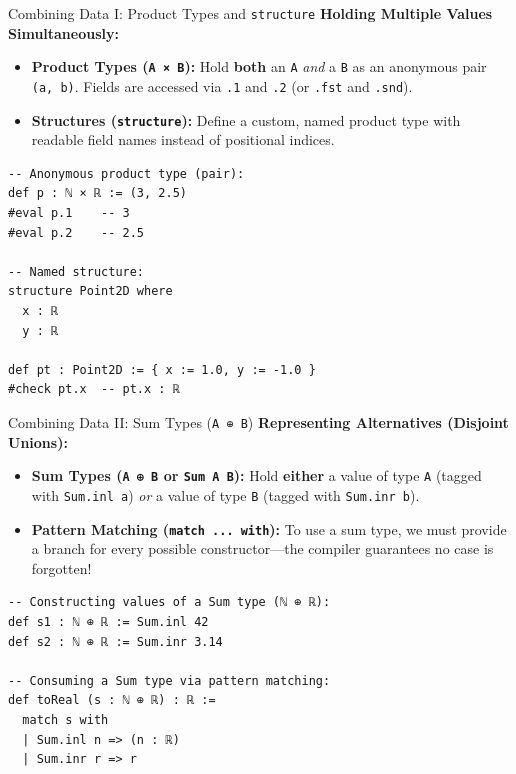 \documentclass[aspectratio=169, 10pt]{beamer}
\begin{document}
\begin{frame}[fragile]{Combining Data I: Product Types and \texttt{structure}}
  \textbf{Holding Multiple Values Simultaneously:}
  \begin{itemize}
    \item \textbf{Product Types (\texttt{A × B}):} Hold \textbf{both} an \texttt{A} \emph{and} a \texttt{B} as an anonymous pair \texttt{(a, b)}. Fields are accessed via \texttt{.1} and \texttt{.2} (or \texttt{.fst} and \texttt{.snd}).
    \item \textbf{Structures (\texttt{structure}):} Define a custom, named product type with readable field names instead of positional indices.
  \end{itemize}

  \vspace{0.15cm}
\begin{lstlisting}[language=Lean4]
-- Anonymous product type (pair):
def p : ℕ × ℝ := (3, 2.5)
#eval p.1    -- 3
#eval p.2    -- 2.5

-- Named structure:
structure Point2D where
  x : ℝ
  y : ℝ

def pt : Point2D := { x := 1.0, y := -1.0 }
#check pt.x  -- pt.x : ℝ
\end{lstlisting}
\end{frame}

\begin{frame}[fragile]{Combining Data II: Sum Types (\texttt{A ⊕ B})}
  \textbf{Representing Alternatives (Disjoint Unions):}
  \begin{itemize}
    \item \textbf{Sum Types (\texttt{A ⊕ B} or \texttt{Sum A B}):} Hold \textbf{either} a value of type \texttt{A} (tagged with \texttt{Sum.inl a}) \emph{or} a value of type \texttt{B} (tagged with \texttt{Sum.inr b}).
    \item \textbf{Pattern Matching (\texttt{match ... with}):} To use a sum type, we must provide a branch for every possible constructor---the compiler guarantees no case is forgotten!
  \end{itemize}

  \vspace{0.15cm}
\begin{lstlisting}[language=Lean4]
-- Constructing values of a Sum type (ℕ ⊕ ℝ):
def s1 : ℕ ⊕ ℝ := Sum.inl 42
def s2 : ℕ ⊕ ℝ := Sum.inr 3.14

-- Consuming a Sum type via pattern matching:
def toReal (s : ℕ ⊕ ℝ) : ℝ :=
  match s with
  | Sum.inl n => (n : ℝ)
  | Sum.inr r => r
\end{lstlisting}
\end{frame}
\end{document}
